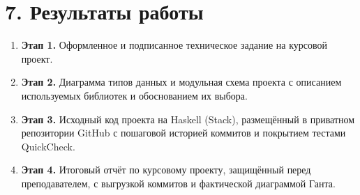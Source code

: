 \documentclass[a4paper, final]{article}
\begin{document}
\newpage

\section*{7. Результаты работы}

\begin{enumerate}
    \item \textbf{Этап 1.} Оформленное и подписанное техническое задание на курсовой проект.
    \item \textbf{Этап 2.} Диаграмма типов данных и модульная схема проекта с описанием используемых библиотек и обоснованием их выбора.
    \item \textbf{Этап 3.} Исходный код проекта на Haskell (Stack), размещённый в приватном репозитории GitHub с пошаговой историей коммитов и покрытием тестами QuickCheck.
    \item \textbf{Этап 4.} Итоговый отчёт по курсовому проекту, защищённый перед преподавателем, с выгрузкой коммитов и фактической диаграммой Ганта.
\end{enumerate}
\end{document}
